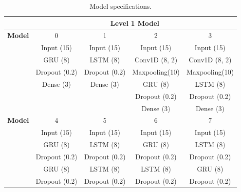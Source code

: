 \begin{table}[htbp]
  \centering
  \caption{Model specifications.}
    \begin{tabular}{r|cccccccc}
          & \multicolumn{8}{c}{Level 1 Model} \\
    \midrule
    \textbf{Model} & \multicolumn{2}{c}{0} & \multicolumn{2}{c}{1} & \multicolumn{2}{c}{2} & \multicolumn{2}{c}{3} \\
    \midrule
          & \multicolumn{2}{c}{Input (15)} & \multicolumn{2}{c}{Input (15)} & \multicolumn{2}{c}{Input (15)} & \multicolumn{2}{c}{Input (15)} \\
          & \multicolumn{2}{c}{GRU (8)} & \multicolumn{2}{c}{LSTM (8)} & \multicolumn{2}{c}{Conv1D (8, 2)} & \multicolumn{2}{c}{Conv1D (8, 2)} \\
          & \multicolumn{2}{c}{Dropout (0.2)} & \multicolumn{2}{c}{Dropout (0.2)} & \multicolumn{2}{c}{Maxpooling(10)} & \multicolumn{2}{c}{Maxpooling(10)} \\
          & \multicolumn{2}{c}{Dense (3)} & \multicolumn{2}{c}{Dense (3)} & \multicolumn{2}{c}{GRU (8)} & \multicolumn{2}{c}{LSTM (8)} \\
          & \multicolumn{2}{c}{} & \multicolumn{2}{c}{} & \multicolumn{2}{c}{Dropout (0.2)} & \multicolumn{2}{c}{Dropout (0.2)} \\
          & \multicolumn{2}{c}{} & \multicolumn{2}{c}{} & \multicolumn{2}{c}{Dense (3)} & \multicolumn{2}{c}{Dense (3)} \\
    \midrule
    \textbf{Model} & \multicolumn{2}{c}{4} & \multicolumn{2}{c}{5} & \multicolumn{2}{c}{6} & \multicolumn{2}{c}{7} \\
    \midrule
          & \multicolumn{2}{c}{Input (15)} & \multicolumn{2}{c}{Input (15)} & \multicolumn{2}{c}{Input (15)} & \multicolumn{2}{c}{Input (15)} \\
          & \multicolumn{2}{c}{GRU (8)} & \multicolumn{2}{c}{LSTM (8)} & \multicolumn{2}{c}{GRU (8)} & \multicolumn{2}{c}{LSTM (8)} \\
          & \multicolumn{2}{c}{Dropout (0.2)} & \multicolumn{2}{c}{Dropout (0.2)} & \multicolumn{2}{c}{Dropout (0.2)} & \multicolumn{2}{c}{Dropout (0.2)} \\
          & \multicolumn{2}{c}{GRU (8)} & \multicolumn{2}{c}{LSTM (8)} & \multicolumn{2}{c}{LSTM (8)} & \multicolumn{2}{c}{GRU (8)} \\
          & \multicolumn{2}{c}{Dropout (0.2)} & \multicolumn{2}{c}{Dropout (0.2)} & \multicolumn{2}{c}{Dropout (0.2)} & \multicolumn{2}{c}{Dropout (0.2)} \\

\end{tabular}
\end{table}
